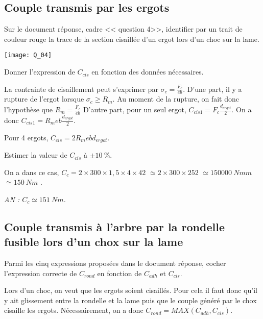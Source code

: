 \documentclass[11pt]{article}
\begin{document}
\subsection{Couple transmis par les ergots}

\UPSTIquestion* Sur le document réponse, cadre << question  4>>, identifier par un trait de couleur rouge la trace de la section cisaillée d'un ergot lors d'un choc sur la lame.

\begin{UPSTIcorrige}

\begin{center}
\texttt{[image: Q\_04]}
\end{center}
\end{UPSTIcorrige}

\UPSTIquestion Donner l'expression de $C_{cis}$ en fonction des données nécessaires. 

\begin{UPSTIcorrige}
La contrainte de cisaillement peut s'exprimer par $\sigma_c = \frac{F_c}{eb}$.
D'une part, il y a rupture de l'ergot lorsque $\sigma_c \geq R_m$. Au moment de la rupture, on fait donc l'hypothèse que
$R_m = \frac{F_c}{eb}$
D'autre part, pour un seul ergot, $C_{cis1} = F_c \frac{d_{ergot}}{2}$.
On a donc $C_{cis1} = R_m e b \frac{d_{ergot}}{2}$. 

Pour 4 ergots, $C_{cis} = 2R_m e b d_{ergot}$. 
\end{UPSTIcorrige}

\UPSTIquestion Estimer la valeur de $C_{cis}$ à  $\pm\SI{10}{\%}$.

\begin{UPSTIcorrige}
On a dans ce cas, $C_c = 2 \times 300 \times 1,5 \times  4 \times 42$
$ \simeq 2 \times 300 \times 252$ $ \simeq \SI{150000}{Nmm}$ $\simeq \SI{150}{Nm}$ .

\textit{AN : $C_{c}\simeq \SI{151}{Nm}$.}
\end{UPSTIcorrige}

\subsection{Couple transmis à l'arbre par la rondelle fusible lors d'un chox sur la lame}
\UPSTIquestion* Parmi les cinq expressions proposées dans le document réponse, cocher l'expression correcte de $C_{rond}$ en fonction de 
$C_{adh}$ et $C_{cis}$.

\begin{UPSTIcorrige}
Lors d'un choc, on veut que les ergots soient cisaillés. Pour cela il faut donc qu'il y ait glissement entre la rondelle et la lame puis que le couple généré par le chox cisaille les ergots. 
Nécessairement, on a donc $C_{rond}=MAX\left(C_{adh},C_{cis}\right)$.
\end{UPSTIcorrige}
\end{document}
